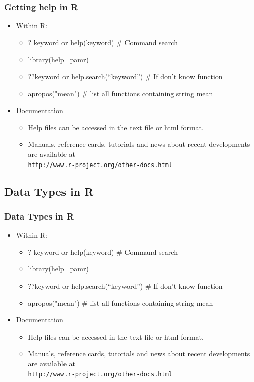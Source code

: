 \documentclass[12pt]{beamer}
\begin{document}
\begin{frame}[fragile]
\frametitle{Getting help in R }
\begin{itemize}\justifying
	\item Within R:
	\begin{itemize}\justifying
		\item $?$ keyword or help(keyword)  \hfill \# Command search
		\item library(help=pamr)
		\item $??$keyword or help.search(“keyword”)  \hfill \# If don’t know function
		\item apropos("mean")  \hfill \# list all functions containing
		string mean
	\end{itemize}
	\item Documentation
	\begin{itemize}\justifying
		\item Help files can be accessed in the text file or html format.
		\item Manuals, reference cards, tutorials and news about recent developments
		are available at \\ \verb|http://www.r-project.org/other-docs.html|
	\end{itemize}
\end{itemize}
\end{frame}

\begin{frame}[fragile]
\section{Data Types in R }
\frametitle{Data Types in R }
\begin{itemize}\justifying
	\item Within R:
	\begin{itemize}\justifying
		\item $?$ keyword or help(keyword)  \hfill \# Command search
		\item library(help=pamr)
		\item $??$keyword or help.search(“keyword”)  \hfill \# If don’t know function
		\item apropos("mean")  \hfill \# list all functions containing
		string mean
	\end{itemize}
	\item Documentation
	\begin{itemize}\justifying
		\item Help files can be accessed in the text file or html format.
		\item Manuals, reference cards, tutorials and news about recent developments
		are available at \\ \verb|http://www.r-project.org/other-docs.html|
	\end{itemize}
\end{itemize}
\end{frame}
\end{document}
